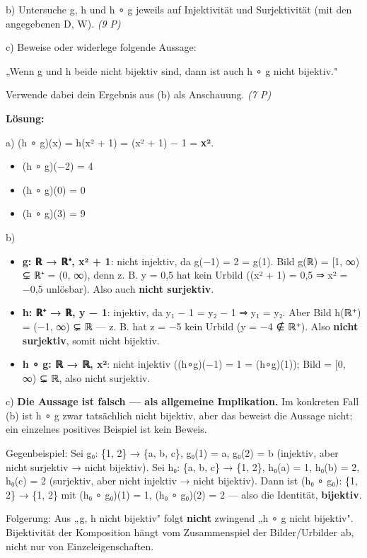 \documentclass[11pt, a4paper]{article}
\begin{document}
b) Untersuche g, h und h ∘ g jeweils auf Injektivität und Surjektivität (mit den angegebenen D, W). \textit{(9 P)}


c) Beweise oder widerlege folgende Aussage:

„Wenn g und h beide nicht bijektiv sind, dann ist auch h ∘ g nicht bijektiv."

Verwende dabei dein Ergebnis aus (b) als Anschauung. \textit{(7 P)}


\textbf{Lösung:}


a) (h ∘ g)(x) = h(x² + 1) = (x² + 1) − 1 = \textbf{x²}.

\begin{itemize}
  \item (h ∘ g)(−2) = 4
  \item (h ∘ g)(0) = 0
  \item (h ∘ g)(3) = 9
\end{itemize}

b)

\begin{itemize}
  \item \textbf{g: ℝ → ℝ⁺, x² + 1}: nicht injektiv, da g(−1) = 2 = g(1). Bild g(ℝ) = [1, ∞) ⊊ ℝ⁺ = (0, ∞), denn z. B. y = 0,5 hat kein Urbild ((x² + 1) = 0,5 ⇒ x² = −0,5 unlösbar). Also auch \textbf{nicht surjektiv}.
  \item \textbf{h: ℝ⁺ → ℝ, y − 1}: injektiv, da y₁ − 1 = y₂ − 1 ⇒ y₁ = y₂. Aber Bild h(ℝ⁺) = (−1, ∞) ⊊ ℝ — z. B. hat z = −5 kein Urbild (y = −4 ∉ ℝ⁺). Also \textbf{nicht surjektiv}, somit nicht bijektiv.
  \item \textbf{h ∘ g: ℝ → ℝ, x²}: nicht injektiv ((h∘g)(−1) = 1 = (h∘g)(1)); Bild = [0, ∞) ⊊ ℝ, also nicht surjektiv.
\end{itemize}

c) \textbf{Die Aussage ist falsch — als allgemeine Implikation.} Im konkreten Fall (b) ist h ∘ g zwar tatsächlich nicht bijektiv, aber das beweist die Aussage nicht; ein einzelnes positives Beispiel ist kein Beweis.


Gegenbeispiel: Sei g₀: \{1, 2\} → \{a, b, c\}, g₀(1) = a, g₀(2) = b (injektiv, aber nicht surjektiv → nicht bijektiv). Sei h₀: \{a, b, c\} → \{1, 2\}, h₀(a) = 1, h₀(b) = 2, h₀(c) = 2 (surjektiv, aber nicht injektiv → nicht bijektiv). Dann ist (h₀ ∘ g₀): \{1, 2\} → \{1, 2\} mit (h₀ ∘ g₀)(1) = 1, (h₀ ∘ g₀)(2) = 2 — also die Identität, \textbf{bijektiv}.


Folgerung: Aus „g, h nicht bijektiv" folgt \textbf{nicht} zwingend „h ∘ g nicht bijektiv". Bijektivität der Komposition hängt vom Zusammenspiel der Bilder/Urbilder ab, nicht nur von Einzeleigenschaften.





\end{document}

